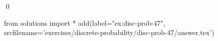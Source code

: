 
\begin{ex} 
  \label{ex:disc-prob-47}
  
  \qed
\end{ex} 
\begin{python0}
from solutions import *
add(label="ex:disc-prob-47",
    srcfilename='exercises/discrete-probability/disc-prob-47/answer.tex') 
\end{python0}
